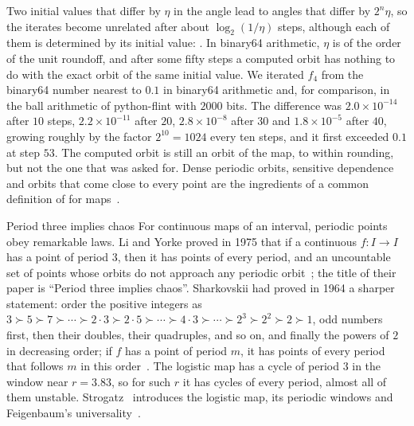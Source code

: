 Two initial values that differ by $\eta$ in the angle lead to angles that differ by $2^n\eta$, so the iterates become unrelated after about $\log_2(1/\eta)$ steps, although each of them is determined by its initial value: . In binary64 arithmetic, $\eta$ is of the order of the unit roundoff, and after some fifty steps a computed orbit has nothing to do with the exact orbit of the same initial value. We iterated $f_4$ from the binary64 number nearest to $0.1$ in binary64 arithmetic and, for comparison, in the ball arithmetic of python-flint with $2000$ bits. The difference was $2.0\times10^{-14}$ after $10$ steps, $2.2\times10^{-11}$ after $20$, $2.8\times10^{-8}$ after $30$ and $1.8\times10^{-5}$ after $40$, growing roughly by the factor $2^{10}=1024$ every ten steps, and it first exceeded $0.1$ at step $53$. The computed orbit is still an orbit of the map, to within rounding, but not the one that was asked for. Dense periodic orbits, sensitive dependence and orbits that come close to every point are the ingredients of a common definition of  for maps~\cite[Sect.~15.4]{hirsch2013}.

\begin{note}{Period three implies chaos}
For continuous maps of an interval, periodic points obey remarkable laws. Li and Yorke proved in 1975 that if a continuous $f\colon I\to I$ has a point of period $3$, then it has points of every period, and an uncountable set of points whose orbits do not approach any periodic orbit~\cite{li1975}; the title of their paper is ``Period three implies chaos''. Sharkovskii had proved in 1964 a sharper statement: order the positive integers as $3\succ5\succ7\succ\cdots\succ2\cdot3\succ2\cdot5\succ\cdots\succ4\cdot3\succ\cdots\succ2^3\succ2^2\succ2\succ1$, odd numbers first, then their doubles, their quadruples, and so on, and finally the powers of $2$ in decreasing order; if $f$ has a point of period $m$, it has points of every period that follows $m$ in this order~\cite{sharkovskii1964}. The logistic map has a cycle of period $3$ in the window near $r=3.83$, so for such $r$ it has cycles of every period, almost all of them unstable. Strogatz~\cite[Chap.~10]{strogatz2015} introduces the logistic map, its periodic windows and Feigenbaum's universality~\cite{feigenbaum1978}.
\end{note}

